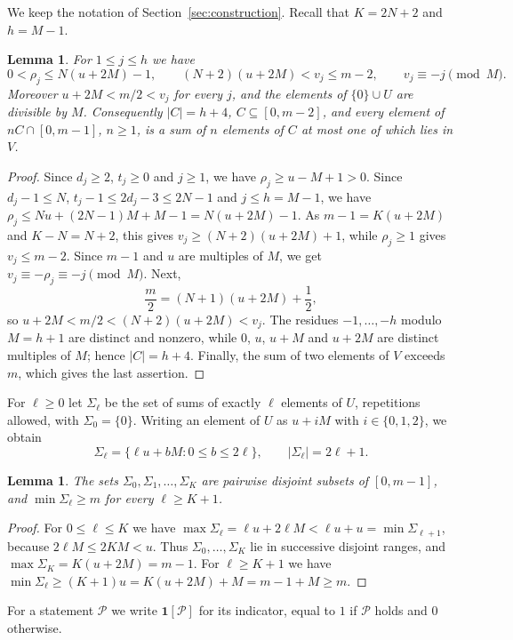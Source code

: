 \documentclass[11pt]{amsart}
\newtheorem{lemma}[theorem]{Lemma}
\theoremstyle{definition}
\theoremstyle{remark}
\numberwithin{equation}{section}
\newcommand{\ind}[1]{\mathbf{1}[#1]}
\begin{document}
We keep the notation of Section~\ref{sec:construction}. Recall that $K=2N+2$ and $h=M-1$.

\begin{lemma}\label{lem:separation}
For $1\le j\le h$ we have
\[
0<\rho_j\le N(u+2M)-1,\qquad (N+2)(u+2M)<v_j\le m-2,\qquad v_j\equiv -j\pmod M.
\]
Moreover $u+2M<m/2<v_j$ for every $j$, and the elements of $\{0\}\cup U$ are divisible by $M$. Consequently $|C|=h+4$, $C\subseteq[0,m-2]$, and every element of $nC\cap[0,m-1]$, $n\ge1$, is a sum of $n$ elements of $C$ at most one of which lies in $V$.
\end{lemma}

\begin{proof}
Since $d_j\ge 2$, $t_j\ge 0$ and $j\ge 1$, we have $\rho_j\ge u-M+1>0$. Since $d_j-1\le N$, $t_j-1\le 2d_j-3\le 2N-1$ and $j\le h=M-1$, we have $\rho_j\le Nu+(2N-1)M+M-1=N(u+2M)-1$. As $m-1=K(u+2M)$ and $K-N=N+2$, this gives $v_j\ge(N+2)(u+2M)+1$, while $\rho_j\ge 1$ gives $v_j\le m-2$. Since $m-1$ and $u$ are multiples of $M$, we get $v_j\equiv-\rho_j\equiv -j\pmod M$. Next,
\[
\frac m2=(N+1)(u+2M)+\frac12,
\]
so $u+2M<m/2<(N+2)(u+2M)<v_j$. The residues $-1,\dots,-h$ modulo $M=h+1$ are distinct and nonzero, while $0$, $u$, $u+M$ and $u+2M$ are distinct multiples of $M$; hence $|C|=h+4$. Finally, the sum of two elements of $V$ exceeds $m$, which gives the last assertion.
\end{proof}

For $\ell\ge 0$ let $\Sigma_\ell$ be the set of sums of exactly $\ell$ elements of $U$, repetitions allowed, with $\Sigma_0=\{0\}$. Writing an element of $U$ as $u+iM$ with $i\in\{0,1,2\}$, we obtain
\[
\Sigma_\ell=\{\ell u+bM:0\le b\le 2\ell\},\qquad |\Sigma_\ell|=2\ell+1.
\]

\begin{lemma}\label{lem:rows}
The sets $\Sigma_0,\Sigma_1,\dots,\Sigma_K$ are pairwise disjoint subsets of $[0,m-1]$, and $\min\Sigma_\ell\ge m$ for every $\ell\ge K+1$.
\end{lemma}

\begin{proof}
For $0\le\ell\le K$ we have $\max\Sigma_\ell=\ell u+2\ell M<\ell u+u=\min\Sigma_{\ell+1}$, because $2\ell M\le 2KM<u$. Thus $\Sigma_0,\dots,\Sigma_K$ lie in successive disjoint ranges, and $\max\Sigma_K=K(u+2M)=m-1$. For $\ell\ge K+1$ we have $\min\Sigma_\ell\ge(K+1)u=K(u+2M)+M=m-1+M\ge m$.
\end{proof}

For a statement $\mathcal{P}$ we write $\ind{\mathcal{P}}$ for its indicator, equal to $1$ if $\mathcal{P}$ holds and $0$ otherwise.
\end{document}
